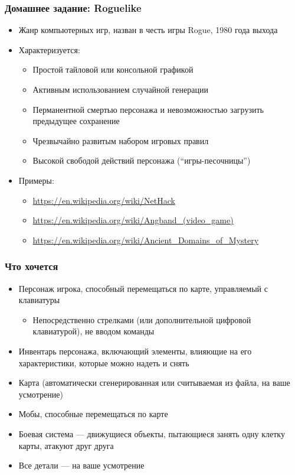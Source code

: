 \documentclass[xetex,mathserif,serif]{beamer}
\begin{document}
	\begin{frame}
		\frametitle{Домашнее задание: Roguelike}
		\begin{itemize}
			\item Жанр компьютерных игр, назван в честь игры Rogue, 1980 года выхода
			\item Характеризуется:
			\begin{itemize}
				\item Простой тайловой или консольной графикой
				\item Активным использованием случайной генерации
				\item Перманентной смертью персонажа и невозможностью загрузить предыдущее сохранение
				\item Чрезвычайно развитым набором игровых правил
				\item Высокой свободой действий персонажа (``игры-песочницы'')
			\end{itemize}
			\item Примеры:
			\begin{itemize}
				\item \url{https://en.wikipedia.org/wiki/NetHack}
				\item \url{https://en.wikipedia.org/wiki/Angband_(video_game)}
				\item \url{https://en.wikipedia.org/wiki/Ancient_Domains_of_Mystery}
			\end{itemize}
		\end{itemize}
	\end{frame}

	\begin{frame}
		\frametitle{Что хочется}
		\begin{itemize}
			\item Персонаж игрока, способный перемещаться по карте, управляемый с клавиатуры
			\begin{itemize}
				\item Непосредственно стрелками (или дополнительной цифровой клавиатурой), не вводом команды
			\end{itemize}
			\item Инвентарь персонажа, включающий элементы, влияющие на его характеристики, которые можно надеть и снять
			\item Карта (автоматически сгенерированная или считываемая из файла, на ваше усмотрение)
			\item Мобы, способные перемещаться по карте
			\item Боевая система --- движущиеся объекты, пытающиеся занять одну клетку карты, атакуют друг друга
			\item Все детали --- на ваше усмотрение
		\end{itemize}
	\end{frame}
\end{document}
